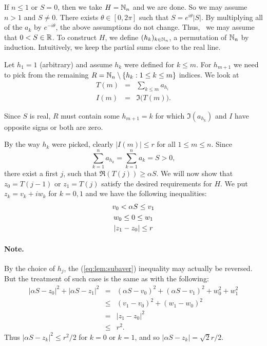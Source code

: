 \begin{thmproof}
If \(n\leq 1\) or \(S=0\), then we take \(H=\mathbb{N}_n\) and we are done.
So we may assume \(n>1\) and \(S\neq 0\).
There exists \(\theta\in[0,2\pi]\) such that \(S= e^{i\theta}|S|\).
By multiplying all of the \(a_k\) by \(e^{-i\theta}\),
the above assumptions do not change.
Thus, \wlogy\ we may assume that \(0< S \in\mathbb{R}\).
To construct $H$, we define \((h_k)_{k\in\mathbb{N}_n}\),
a permutation of \(\mathbb{N}_n\) by induction. Intuitively,
we keep the partial sums close to the real line.

Let \(h_1=1\) (arbitrary) and assume \(h_k\) were defined for \(k\leq m\).
For \(h_{m+1}\) we need to pick from the remaining
\(R = \mathbb{N}_n\setminus \{h_k: 1\leq k \leq m\}\) indices.
We look at
\begin{eqnarray*}
T(m) &=& \sum_{k\leq m} a_{h_i} \\
I(m) &=& \Im\bigl(T(m)\bigr).
\end{eqnarray*}

Since $S$ is real, $R$ must contain some \(h_{m+1}=k\) for which
\(\Im(a_{h_k})\) and $I$ have opposite signs or both are zero.

By the way \(h_k\) were picked,
clearly \(|I(m)| \leq r\) for all \(1\leq m \leq n\).
Since
\begin{equation*}
\sum_{k=1}^n a_{h_k} = \sum_{k=1}^n a_k = S > 0,
\end{equation*}
there exist a first $j$, such that \(\Re(T(j)) \geq \alpha S\).
We will now show that \(z_0 =  T(j-1)\) or \(z_1 = T(j)\)
satisfy the desired requirements for $H$.
We put \(z_k = v_k + iw_k\) for \(k=0,1\) and we have the following
inequalities:
\begin{gather}
v_0 < \alpha S \leq v_1 \notag \\
w_0  \leq 0 \leq w_1 \label{eq:lem:subaver} \\
 |z_1 - z_0| \leq r \notag
\end{gather}
\paragraph{Note.} By the choice of \(h_j\),
the (\ref{eq:lem:subaver}) inequality may actually be reversed.
But the treatment of such case is the same as with the following:
\begin{eqnarray*}
 |\alpha S - z_0|^2 +  |\alpha S - z_1|^2
 &=&
  (\alpha S - v_0)^2 + (\alpha S - v_1)^2  + w_0^2 + w_1^2 \\
 &\leq&
  (v_1 - v_0)^2 + (w_1 - w_0)^2 \\
 &=& |z_1 - z_0|^2 \\
 &\leq& r^2.
\end{eqnarray*}
Thus \(|\alpha S - z_k|^2 \leq r^2/2\) for \(k=0\) or \(k=1\), and so
\(|\alpha S - z_k| = \sqrt{2}r/2\).
\end{thmproof}


